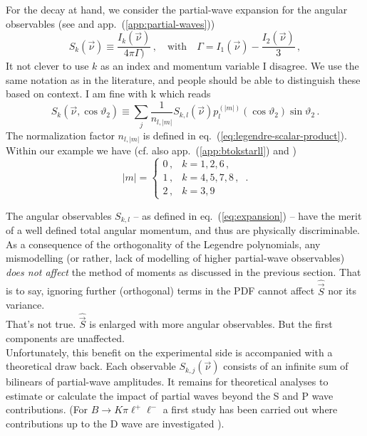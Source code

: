 \documentclass[aps,prd,reprint,nofootinbib,preprintnumbers]{revtex4}
\newcommand{\nuvec}{\vec{\nu}}
\newcommand{\refapp}[1]{app.~(\ref{app:#1})}
\newcommand{\refeq}[1]{eq.~(\ref{eq:#1})}
\renewcommand{\theta}{\vartheta}
\newcommand{\vecest}[1]{\widehat{\vec{#1}}}
\newcommand{\danny}[1]{{\color{purple}#1}}
\newcommand{\fred}[1]{{\color{brown!85!black}#1}}
\newcommand{\marcin}[1]{{\color{cyan}#1}}
\begin{document}
For the decay at hand, we consider the partial-wave expansion for the angular observables (see \cite{Lee:1992ih} and \refapp{partial-waves})
\begin{equation}
    S_k(\vec{\nu}) \equiv \frac{I_k(\nuvec)}{4\pi \Gamma)}\,,\quad\text{with}\quad \Gamma = I_1(\nuvec) - \frac{I_2(\nuvec)}{3}\,,
\end{equation}
\fred{It not clever to use $k$ as an index and momentum variable}
\danny{I disagree. We use the same notation as in the literature, and people
should be able to distinguish these based on context.} \marcin{I am fine with k}
which reads
\begin{equation}
    \label{eq:expansion}
    S_{k}(\vec{\nu},\cos\theta_2) \equiv \sum_{j} \frac{1}{n_{l,|m|}} S_{k,l}(\vec{\nu}) p_{l}^{(|m|)}(\cos\theta_2)\sin\theta_2\,.
\end{equation}
The normalization factor $n_{l,|m|}$ is defined in \refeq{legendre-scalar-product}. Within our
example we have (cf. also \refapp{btokstarll} and \cite{Lee:1992ih})
\begin{equation}
    |m| = \begin{cases}
        0\,, & k = 1,2,6\,,\\
        1\,, & k = 4,5,7,8\,,\\
        2\,, & k = 3,9
    \end{cases}\,.
\end{equation}

The angular observables $S_{k,l}$ -- as defined in \refeq{expansion} --
have the merit of a well defined total angular momentum, and thus are physically discriminable.
As a consequence of the orthogonality of the Legendre polynomials, any mismodelling (or rather, lack of modelling of higher
partial-wave observables) \emph{does not affect} the method of moments as discussed in the previous section. That is to say,
ignoring further (orthogonal) terms in the PDF cannot affect $\vecest{S}$ nor its variance.\\
\fred{That's not true. $\vecest{S}$ is enlarged with more angular observables. But the first components are unaffected.}\\

Unfortunately, this benefit on the experimental side is accompanied with a theoretical draw back. Each observable
$S_{k,j}(\vec{\nu})$ consists of an infinite sum of bilinears of partial-wave amplitudes. It remains for theoretical
analyses to estimate or calculate the impact of partial waves beyond the S and P wave contributions.
(For $B\to K\pi\ell^+\ell^-$ a first study has been carried out where contributions up to the D wave are investigated \cite{Das:2014sra}).\\
\end{document}
